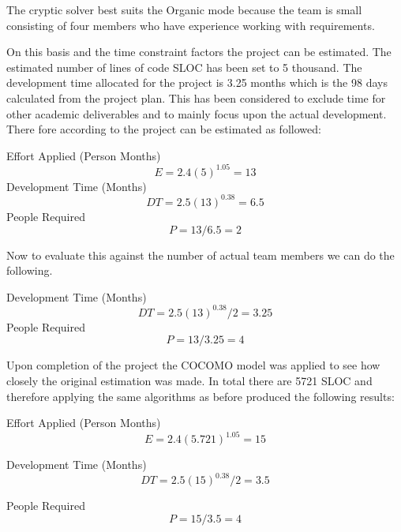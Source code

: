 The cryptic solver best suits the Organic mode because the team is small 
consisting of four members who have experience working with requirements. 

On this basis and the time constraint factors the project can be estimated. 
The estimated number of lines of code SLOC has been set to 5 thousand. The
development time allocated for the project is 3.25 months which is the 98 days
calculated from the project plan. This has been considered to exclude time for
other academic deliverables and to mainly focus upon the actual development.
There fore according to \citet{cocomo2} the project can be estimated as
followed:

Effort Applied (Person Months)
\[
  E = 2.4(5)^{1.05} = 13
\]
Development Time (Months)
\[
  DT = 2.5(13)^{0.38} = 6.5 
\]
People Required
\[
  P = 13/6.5 = 2
\]

Now to evaluate this against the number of actual team members we can do the 
following.

Development Time (Months)
\[
  DT = 2.5(13)^{0.38}/2 = 3.25
\]
People Required
\[
  P = 13/3.25 = 4
\]

Upon completion of the project the COCOMO model was applied to see how closely 
the original estimation was made. In total there are 5721 SLOC and therefore 
applying the same algorithms as before produced the following results:

Effort Applied (Person Months)
\[
  E = 2.4(5.721)^{1.05} = 15
\]

Development Time (Months)
\[
  DT = 2.5(15)^{0.38}/2 = 3.5
\]

People Required
\[
  P = 15/3.5 = 4
\]
